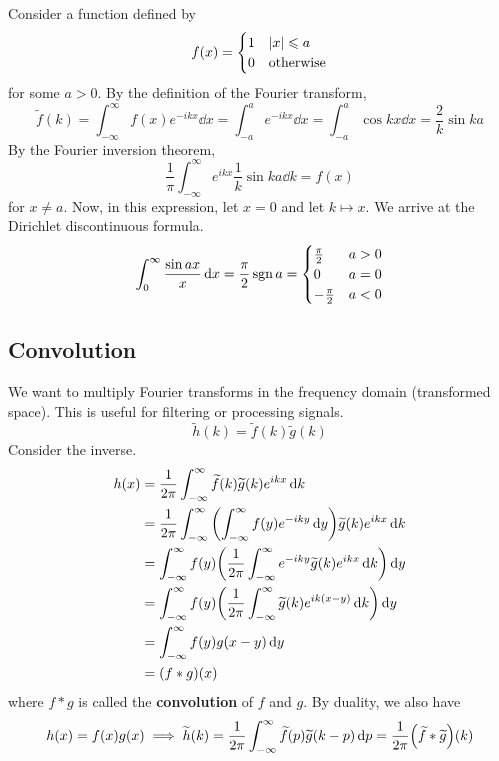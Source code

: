 \documentclass[a4paper]{article}
\begin{document}
\begin{example}
	Consider a function defined by
	\[
		f(x) = \begin{cases}
			1 & \abs{x} \leqslant a   \\
			0 & \text{otherwise}
		\end{cases}
	\]
	for some \( a > 0 \).
	By the definition of the Fourier transform,
	\[
		\widetilde f(k) = \int_{-\infty}^\infty f(x) e^{-ikx} \dd{x} = \int_{-a}^a e^{-ikx} \dd{x} = \int_{-a}^a \cos kx \dd{x} = \frac{2}{k} \sin ka
	\]
	By the Fourier inversion theorem,
	\[
		\frac{1}{\pi} \int_{-\infty}^\infty e^{ikx} \frac{1}{k} \sin ka \dd{k} = f(x)
	\]
	for \( x \neq a \).
	Now, in this expression, let \( x = 0 \) and let \( k \mapsto x \).
	We arrive at the Dirichlet discontinuous formula.
	\[
		\int_0^\infty \frac{\sin ax}{x} \dd{x} = \frac{\pi}{2} \operatorname{sgn} a = \begin{cases}
			\frac{\pi}{2}  & a > 0 \\
			0              & a = 0 \\
			-\frac{\pi}{2} & a < 0
		\end{cases}
	\]
\end{example}

\subsection{Convolution}
We want to multiply Fourier transforms in the frequency domain (transformed space).
This is useful for filtering or processing signals.
\[
	\widetilde h(k) = \widetilde f(k) \widetilde g(k)
\]
Consider the inverse.
\begin{align*}
	h(x) & = \frac{1}{2\pi} \int_{-\infty}^\infty \widetilde f(k) \widetilde g(k) e^{ikx} \dd{k}                                    \\
	     & = \frac{1}{2\pi} \int_{-\infty}^\infty \qty(\int_{-\infty}^\infty f(y) e^{-iky} \dd{y}) \widetilde g(k) e^{ikx} \dd{k}   \\
	     & = \int_{-\infty}^\infty f(y) \qty( \frac{1}{2\pi} \int_{-\infty}^\infty e^{-iky} \widetilde g(k) e^{ikx} \dd{k} ) \dd{y} \\
	     & = \int_{-\infty}^\infty f(y) \qty( \frac{1}{2\pi} \int_{-\infty}^\infty \widetilde g(k) e^{ik(x-y)} \dd{k} ) \dd{y}      \\
	     & = \int_{-\infty}^\infty f(y) g(x-y) \dd{y}                                                                               \\
	     & = (f \ast g)(x)
\end{align*}
where \( f \ast g \) is called the \textbf{convolution} of \( f \) and \( g \).
By duality, we also have
\[
	h(x) = f(x) g(x) \implies \widetilde h(k) = \frac{1}{2\pi} \int_{-\infty}^\infty \widetilde f(p) \widetilde g(k-p) \dd{p} = \frac{1}{2\pi}\qty(\widetilde f \ast \widetilde g)(k)
\]
\end{document}
